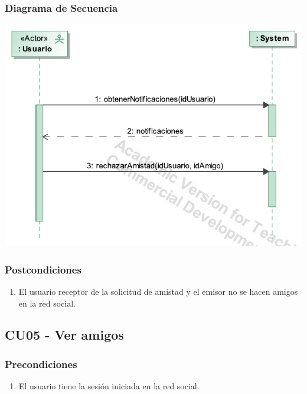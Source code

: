 \documentclass[12pt, a4paper, titlepage]{article}
\begin{document}
\subsubsection{Diagrama de Secuencia}
\begin{center}
	\includegraphics[width=\textwidth]{Imagenes/Rechazar_solicitud_de_amistad}
\end{center}

\subsubsection{Postcondiciones}
\begin{enumerate}
	\item El usuario receptor de la solicitud de amistad y el emisor no se hacen amigos en la red social.
\end{enumerate}


\subsection{CU05 - Ver amigos}

\subsubsection{Precondiciones}
\begin{enumerate}
	\item El usuario tiene la sesión iniciada en la red social.
\end{enumerate}
\end{document}
